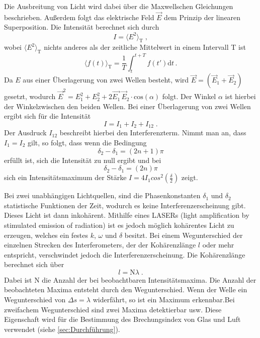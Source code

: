 Die Ausbreitung von Licht wird dabei über die Maxwellschen Gleichungen beschrieben. Außerdem folgt das elektrische Feld 
$\vec{E}$ dem Prinzip der linearen Superposition.
Die Intensität berechnet sich durch 
\begin{equation*}
    I = \langle E^2\rangle _{\text{T}} \; ,
\end{equation*}
wobei $\langle E^2\rangle _{\text{T}}$ nichts anderes als der zeitliche Mittelwert in einem Intervall T ist
\begin{equation}
    \langle f(t) \rangle _{\text{T}} = \frac{1}{T}\int_t^{t+T} f(t')\text{d}t \, .
    \label{eqn:zeitlichMittel}
\end{equation}
Da $E$ aus einer Überlagerung von zwei Wellen besteht, wird $\vec{E}=(\vec{E}_1+\vec{E}_2)$ gesetzt, wodurch $\vec{E}^2= E_1^2+E_2^2+2\vec{E_1}\, \vec{E}_2\cdot\text{cos}(\alpha)$ folgt.
Der Winkel $\alpha$ ist hierbei der Winkelzwischen den beiden Wellen.
Bei einer Überlagerung von zwei Wellen ergibt sich für die Intensität 
\begin{equation*}
    I = I_1 +I_2 +I_{12}\; .
\end{equation*}
Der Ausdruck $I_{12}$ beschreibt hierbei den Interferenzterm.
Nimmt man an, dass $I_1=I_2$ gilt, so folgt, dass
wenn die Bedingung
\begin{equation*}
    \delta_2 -\delta_1 = \left(2n+1\right)\pi 
\end{equation*}
erfüllt ist, sich die Intensität zu null ergibt und
bei 
\begin{equation*}
    \delta_2 -\delta_1 = \left(2n\right)\pi 
\end{equation*}
sich ein Intensitätsmaximum der Stärke $I=4I_1cos^2{\left(\frac{\delta}{2}\right)}$ zeigt.

Bei zwei unabhängigen Lichtquellen, sind die Phasenkonstanten $\delta_1$ und $\delta_2$ statistische Funktionen der Zeit, wodurch es keine 
Interferenzerscheinung gibt. Dieses Licht ist dann inkohärent. Mithilfe eines LASERs (light amplification by stimulated emission of radiation)
ist es jedoch möglich kohärentes Licht zu erzeugen, welches ein festes $k$, $\omega$ und $\delta$ besitzt.
Bei einem Wegunterschied der einzelnen Strecken des Interferometers, der der Kohärenzlänge $l$ oder mehr entspricht, verschwindet jedoch die 
Interferenzerscheinung. Die Kohärenzlänge berechnet sich über
\begin{equation*}
    l = \text{N}\lambda \; .
\end{equation*}
Dabei ist N die Anzahl der bei beobachtbaren Intensitätsmaxima. Die Anzahl der beobachteten Maxima entsteht durch den Wegunterschied. Wenn der Welle ein Wegunterschied von $\Delta s=\lambda$ widerfährt, so ist ein Maximum erkennbar.Bei zweifachem Wegunterschied sind zwei Maxima detektierbar usw.
Diese Eigenschaft wird für die Bestimmung des Brechungsindex von Glas und Luft verwendet (siehe \autoref{sec:Durchführung}).

